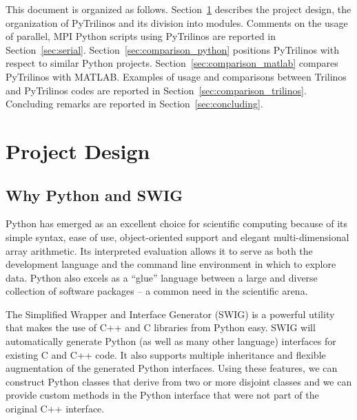 \documentclass[10pt,relax]{SANDreport}
\begin{document}
\smallskip

This document is organized as follows. Section~\ref{sec:design} describes the
project design, the organization of PyTrilinos and its division into modules.
Comments on the usage of
parallel, MPI Python scripts using PyTrilinos are reported in
Section~\ref{sec:serial}.
Section~\ref{sec:comparison_python} positions PyTrilinos with respect to similar Python projects.
Section~\ref{sec:comparison_matlab} compares PyTrilinos with MATLAB.
Examples of usage and comparisons between Trilinos
and PyTrilinos codes are reported in Section~\ref{sec:comparison_trilinos}.
Concluding remarks are reported in Section~\ref{sec:concluding}.

\section{Project Design}
\label{sec:design}

\subsection{Why Python and SWIG}
\label{sec:why}

Python has emerged as an excellent choice for scientific computing
because of its simple syntax, ease of use, object-oriented support
and elegant multi-dimensional array arithmetic. Its interpreted
evaluation allows it to serve as both the development language and
the command line environment in which to explore data. Python also
excels as a ``glue'' language between a large and diverse collection
of software packages -- a common need in the scientific arena.

The Simplified Wrapper and Interface Generator (SWIG) is a powerful
utility that makes the use of C++ and C libraries from Python easy.
SWIG will automatically generate Python (as well as many other
language) interfaces for existing C and C++ code.  It also supports
 multiple inheritance and flexible augmentation of the generated Python interfaces.
 Using these features, we can
construct Python classes that derive from two or more disjoint
classes and we can provide custom methods in the Python interface
that were not part of the original C++ interface.
\end{document}
